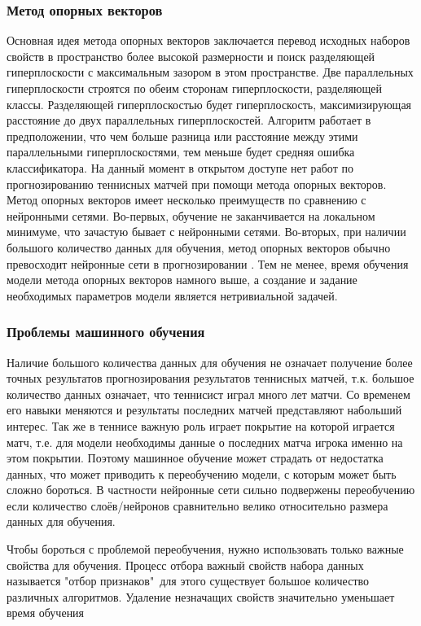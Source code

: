 \subsubsection{Метод опорных векторов}
Основная идея метода опорных векторов заключается перевод исходных наборов свойств  в пространство более высокой размерности и поиск разделяющей гиперплоскости с максимальным зазором в этом пространстве. Две параллельных гиперплоскости строятся по обеим сторонам гиперплоскости, разделяющей классы. Разделяющей гиперплоскостью будет гиперплоскость, максимизирующая расстояние до двух параллельных гиперплоскостей. Алгоритм работает в предположении, что чем больше разница или расстояние между этими параллельными гиперплоскостями, тем меньше будет средняя ошибка классификатора.
На данный момент в открытом доступе нет работ по прогнозированию теннисных матчей при помощи метода опорных векторов\cite{Book13}. Метод опорных векторов имеет несколько преимуществ по сравнению с нейронными сетями. Во-первых, обучение не заканчивается на локальном минимуме, что зачастую бывает с нейронными сетями. Во-вторых, при наличии большого количество данных для обучения, метод опорных векторов обычно превосходит нейронные сети в прогнозировании \cite{Book13}. Тем не менее, время обучения модели метода опорных векторов намного выше, а создание и задание необходимых параметров модели является нетривиальной задачей.

\subsubsection{Проблемы машинного обучения}
Наличие большого количества данных для обучения не означает получение более точных результатов прогнозирования результатов теннисных матчей, т.к. большое количество данных означает, что теннисист играл много лет матчи. Со временем его навыки меняются и результаты последних матчей представляют набольший интерес. Так же в теннисе важную роль играет покрытие на которой играется матч, т.е. для модели необходимы данные о последних матча игрока именно на этом покрытии. Поэтому машинное обучение может страдать от недостатка данных, что может приводить к переобучению модели, с которым может быть сложно бороться. В частности нейронные сети сильно подвержены переобучению если количество слоёв/нейронов сравнительно велико относительно размера данных для обучения.

Чтобы бороться с проблемой переобучения, нужно использовать только важные свойства для обучения. Процесс отбора важный свойств набора данных называется "отбор признаков"\, для этого существует большое количество различных алгоритмов. Удаление незначащих свойств значительно уменьшает время обучения
